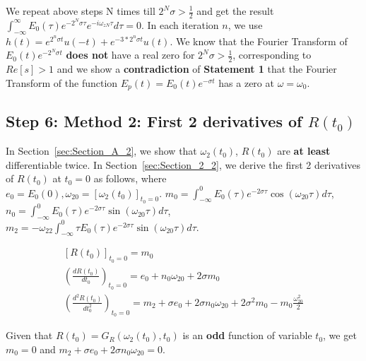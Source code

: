 \documentclass[11pt]{elsarticle}
\begin{document}
We repeat above steps N times till $2^{N} \sigma > \frac{1}{2}$ and get the result $\int_{-\infty}^{\infty}    E_0(\tau) e^{-2^{N} \sigma \tau} e^{-i \omega_{zN} \tau} d\tau = 0$. In each iteration $n$, we use $h(t)=  e^{ 2^{n} \sigma t} u(-t) + e^{ - 3*2^{n} \sigma t} u(t) $. We know that  the Fourier Transform of $E_{0}(t) e^{-2^{N} \sigma t}$  \textbf{does not} have a real zero for $2^{N} \sigma > \frac{1}{2}$, corresponding to $Re[s] > 1$ and we show a \textbf{contradiction} of  \textbf{Statement 1} that the Fourier Transform of the function $E_p(t) = E_0(t) e^{-\sigma t} $ has a zero at $\omega = \omega_{0}$.\\


\subsection{\label{sec:level2} \textbf{Step 6: Method 2: First 2 derivatives of $R(t_0)$  } \protect\\  \lowercase{} }

In Section~\ref{sec:Section_A_2}, we show that  $\omega_2(t_0)$, $R(t_0)$ are \textbf{at least} differentiable twice. 
In Section~\ref{sec:Section_2_2}, we derive the first 2 derivatives of $R(t_0)$ at $t_0=0$ as follows, where \\ $e_0=E_0(0),\omega_{20} = [\omega_{2}(t_0)]_{t_0=0} $. $ m_0 = \int_{-\infty}^{0}    E_0(\tau) e^{-2 \sigma \tau} \cos{ (\omega_{20} \tau)} d\tau $, $ n_0 = \int_{-\infty}^{0}    E_0(\tau) e^{-2 \sigma \tau} \sin{ (\omega_{20} \tau)} d\tau$,\\ $ m_2 = -\omega_{22} \int_{-\infty}^{0}  \tau  E_0(\tau) e^{-2 \sigma \tau} \sin{ (\omega_{20} \tau)} d\tau $. %

\begin{eqnarray*}\label{sec_1_2_eq_3}   
[ R(t_0) ]_{t_0=0} = m_0 \\
(\frac{dR(t_0)}{dt_0})_{t_0=0} =   e_0  + n_0  \omega_{20} + 2 \sigma m_0 \\
(\frac{d^2R(t_0)}{dt_0^2})_{t_0=0} =   m_2 + \sigma e_0  +2 \sigma n_0  \omega_{20}   + 2 \sigma^{2} m_0 - m_0 \frac{\omega_{20}^2}{2} 
\end{eqnarray*}
\begin{equation} \end{equation}

Given that  $R(t_0) = G_R(\omega_2(t_0), t_0)$ is an \textbf{odd} function of variable $t_0$, we get $m_0=0$ and $m_2 + \sigma e_0  +2 \sigma n_0  \omega_{20}  = 0$.
\end{document}
